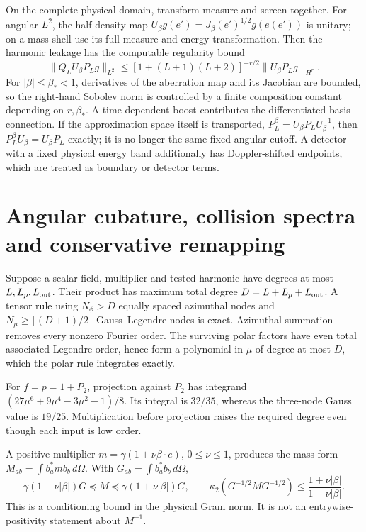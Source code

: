On the complete physical domain, transform measure and screen together. For angular $L^2$, the half-density map
$U_\beta g(e')=J_\beta(e')^{1/2}g(e(e'))$ is unitary; on a mass shell use its full measure and energy transformation. Then the harmonic leakage has the computable regularity bound
\begin{equation}
 \|Q_LU_\beta P_Lg\|_{L^2}
 \le[1+(L+1)(L+2)]^{-r/2}\|U_\beta P_Lg\|_{H^r}.
 \label{v:boost_leakage}
\end{equation}
For $|\beta|\le\beta_*<1$, derivatives of the aberration map and its Jacobian are bounded, so the right-hand Sobolev norm is controlled by a finite composition constant depending on $r,\beta_*$. A time-dependent boost contributes the differentiated basis connection. If the approximation space itself is transported, $P_L^\beta=U_\beta P_LU_\beta^{-1}$, then $P_L^\beta U_\beta=U_\beta P_L$ exactly; it is no longer the same fixed angular cutoff. A detector with a fixed physical energy band additionally has Doppler-shifted endpoints, which are treated as boundary or detector terms.

\section{Angular cubature, collision spectra and conservative remapping}
\label{v:cubature}

Suppose a scalar field, multiplier and tested harmonic have degrees at most $L,L_p,L_{\rm out}$. Their product has maximum total degree
$D=L+L_p+L_{\rm out}$. A tensor rule using $N_\phi>D$ equally spaced azimuthal nodes and
$N_\mu\ge\lceil(D+1)/2\rceil$ Gauss--Legendre nodes is exact. Azimuthal summation removes every nonzero Fourier order. The surviving polar factors have even total associated-Legendre order, hence form a polynomial in $\mu$ of degree at most $D$, which the polar rule integrates exactly.

For $f=p=1+P_2$, projection against $P_2$ has integrand
$(27\mu^6+9\mu^4-3\mu^2-1)/8$. Its integral is $32/35$, whereas the three-node Gauss value is $19/25$. Multiplication before projection raises the required degree even though each input is low order.

A positive multiplier $m=\gamma(1\pm\nu\beta\cdot e)$, $0\le\nu\le1$, produces the mass form $M_{ab}=\int b_a^*mb_b\,d\Omega$. With $G_{ab}=\int b_a^*b_b\,d\Omega$,
\begin{equation}
 \gamma(1-\nu|\beta|)G\preceq M\preceq
 \gamma(1+\nu|\beta|)G,\qquad
 \kappa_2(G^{-1/2}MG^{-1/2})\le
 \frac{1+\nu|\beta|}{1-\nu|\beta|}.
 \label{v:positive_mass_form}
\end{equation}
This is a conditioning bound in the physical Gram norm. It is not an entrywise-positivity statement about $M^{-1}$.

